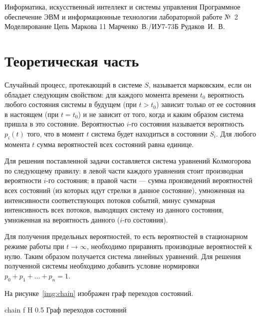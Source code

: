 \documentclass{bmstu}
\begin{document}
\makereporttitle
    {Информатика, искусственный интеллект и системы управления} %
    {Программное обеспечение ЭВМ и информационные технологии} %
    {лабораторной работе №~2} %
    {Моделирование} %
    {Цепь Маркова} %
    {11} %
    {Марченко~В./ИУ7-73Б} %
    {Рудаков~И.~В.} %

{\centering \maketableofcontents}

\chapter{Теоретическая часть}

Случайный процесс, протекающий в системе $S$, называется марковским, если он обладает следующим свойством: для каждого момента времени $t_0$ вероятность любого состояния системы в будущем (при $t > t_0$) зависит только от ее состояния в настоящем (при $t = t_0$) и не зависит от того, когда и каким образом система пришла в это состояние. 
Вероятностью $i$-го состояния называется вероятность $p_i(t)$ того, что в момент $t$ система будет находиться в состоянии $S_i$. 
Для любого момента $t$ сумма вероятностей всех состояний равна единице.

Для решения поставленной задачи составляется система уравнений Колмогорова по следующему правилу: в левой части каждого уравнения стоит производная вероятности $i$-го состояния; в правой части --- сумма произведений вероятностей всех состояний (из которых идут стрелки в данное состояние), умноженная на интенсивности соответствующих потоков событий, минус суммарная интенсивность всех потоков, выводящих систему из данного состояния, умноженная на вероятность данного ($i$-го состояния).

Для получения предельных вероятностей, то есть вероятностей в стационарном режиме работы при $t \rightarrow \infty$, необходимо приравнять производные вероятностей к нулю. 
Таким образом получается система линейных уравнений. 
Для решения полученной системы необходимо добавить условие нормировки $p_0 + p_1 + ... + p_n = 1$.

На рисунке~\ref{img:chain} изображен граф переходов состояний.

    {chain}
    {f}
    {H}
    {0.5\textwidth}
    {Граф переходов состояний}
    
\end{document}
